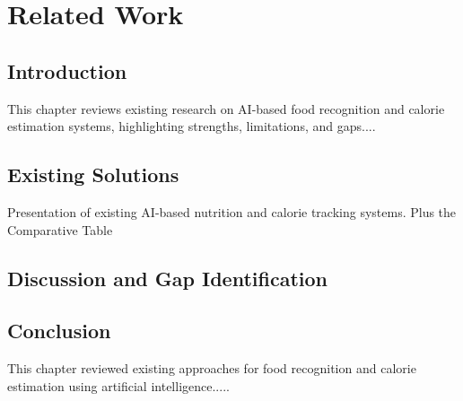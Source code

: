 \chapter{Related Work}
\label{chap:related_work}

\section*{Introduction}
This chapter reviews existing research on AI-based food recognition and calorie estimation systems, highlighting strengths, limitations, and gaps....

\section{Existing Solutions}
Presentation of existing AI-based nutrition and calorie tracking systems. Plus the Comparative Table

\section{Discussion and Gap Identification}

\section*{Conclusion}
This chapter reviewed existing approaches for food recognition and calorie estimation using artificial intelligence.....